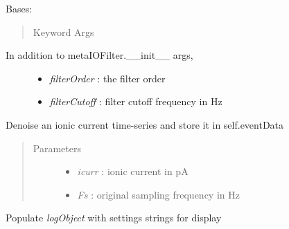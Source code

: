 \documentclass[letterpaper,10pt,english]{sphinxmanual}
\begin{document}
\begin{fulllineitems}
\label{api-doc/mosaic.filter:mosaic.besselLowpassFilter.besselLowpassFilter}
Bases: {\hyperref[api\string-doc/mosaic.meta:mosaic.metaIOFilter.metaIOFilter]{\emph{}}}
\begin{quote}\begin{description}
\item[{Keyword Args}] \leavevmode
\end{description}\end{quote}
\begin{description}
\item[{In addition to metaIOFilter.\_\_init\_\_ args,}] \leavevmode\begin{itemize}
\item {} 
\emph{filterOrder} :               the filter order

\item {} 
\emph{filterCutoff} :      filter cutoff frequency in Hz

\end{itemize}

\end{description}

\begin{fulllineitems}
\label{api-doc/mosaic.filter:mosaic.besselLowpassFilter.besselLowpassFilter.filterData}
Denoise an ionic current time-series and store it in self.eventData
\begin{quote}\begin{description}
\item[{Parameters}] \leavevmode\begin{itemize}
\item {} 
\emph{icurr} :     ionic current in pA

\item {} 
\emph{Fs} :        original sampling frequency in Hz

\end{itemize}

\end{description}\end{quote}

\end{fulllineitems}


\begin{fulllineitems}
\label{api-doc/mosaic.filter:mosaic.besselLowpassFilter.besselLowpassFilter.formatsettings}
Populate \emph{logObject} with settings strings for display

\end{fulllineitems}


\end{fulllineitems}
\end{document}

